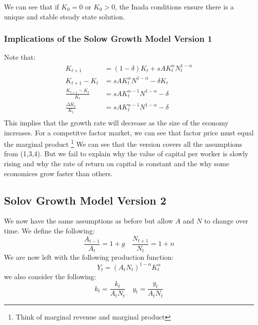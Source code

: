 \documentclass[11pt]{article}
\newtheorem{definition}{Definition}[section]
\begin{document}
We can see that if $K_0 = 0$ or $K_0 > 0$, the Inada conditions ensure there is a unique and stable steady state solution. 

\subsubsection{Implications of the Solow Growth Model Version 1}

Note that:
\begin{align*}
    K_{t+1} &= (1-\delta) K_t + sA K_t^\alpha N_t^{1-\alpha} \\
    K_{t+1} - K_t &= sA K_t^\alpha N^{1-\alpha} - \delta K_t\\
    \frac{K_{t+1} - K_t}{K_t} &= sA K_t^{\alpha-1}N^{1 - \alpha } - \delta\\
    \frac{\Delta K_t}{K_t} &= sA K_t^{\alpha - 1}N^{1- \alpha } - \delta\\
\end{align*}
This implies that the growth rate will decrease as the size of the economy increases. For a competitve factor market, we can see that factor price must equal the marginal product \footnote{Think of marginal revenue and marginal product}
We can see that the version covers all the assumptions from (1,3,4). But we fail to explain why the value of capital per worker is slowly rising and why the rate of return on capital is constant and the why some economices grow faster than others. 
\subsection{Solov Growth Model Version 2}
We now have the same assumptions as before but allow $A$ and $N$ to change over time. We define the following:
\[
\frac{A_{t-1}}{A_t} = 1 +g \quad \frac{N_{t+1}}{N_t} = 1 + n
\]
We are now left with the following production function:
\[
Y_t = (A_t N_t)^{1-\alpha} K_t^\alpha
\]
we also consider the following:
\[
k_t = \frac{k_t}{A_t N_t} \quad y_t = \frac{y_t}{A_tN_t} 
\]


\end{document}
